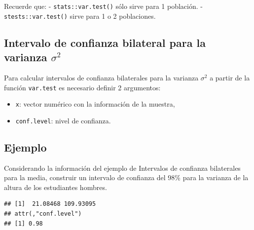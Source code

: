 \documentclass[
]{book}
\makeatletter
\newenvironment{Shaded}{\begin{snugshade}}{\end{snugshade}}
\newcommand{\AttributeTok}[1]{\textcolor[rgb]{0.77,0.63,0.00}{#1}}
\newcommand{\CommentTok}[1]{\textcolor[rgb]{0.56,0.35,0.01}{\textit{#1}}}
\newcommand{\FloatTok}[1]{\textcolor[rgb]{0.00,0.00,0.81}{#1}}
\newcommand{\FunctionTok}[1]{\textcolor[rgb]{0.00,0.00,0.00}{#1}}
\newcommand{\NormalTok}[1]{#1}
\newcommand{\OtherTok}[1]{\textcolor[rgb]{0.56,0.35,0.01}{#1}}
\newcommand{\SpecialCharTok}[1]{\textcolor[rgb]{0.00,0.00,0.00}{#1}}
\providecommand{\tightlist}{%
  \setlength{\itemsep}{0pt}\setlength{\parskip}{0pt}}
\newenvironment{kframe}{%
\medskip{}
\setlength{\fboxsep}{.8em}
 \def\at@end@of@kframe{}%
 \ifinner\ifhmode%
  \def\at@end@of@kframe{\end{minipage}}%
  \begin{minipage}{\columnwidth}%
 \fi\fi%
 \def\FrameCommand##1{\hskip\@totalleftmargin \hskip-\fboxsep
 \colorbox{shadecolor}{##1}\hskip-\fboxsep
     \hskip-\linewidth \hskip-\@totalleftmargin \hskip\columnwidth}%
 \MakeFramed {\advance\hsize-\width
   \@totalleftmargin\z@ \linewidth\hsize
   \@setminipage}}%
 {\par\unskip\endMakeFramed%
 \at@end@of@kframe}
\renewenvironment{Shaded}{\begin{kframe}}{\end{kframe}}
\newenvironment{rmdblock}[1]
  {
  \begin{itemize}
  \renewcommand{\labelitemi}{
    \raisebox{-.7\height}[0pt][0pt]{
      {\setkeys{Gin}{width=3em,keepaspectratio}\texttt{[image: images/\#1]}}
    }
  }
  \setlength{\fboxsep}{1em}
  \begin{kframe}
  \item
  }
  {
  \end{kframe}
  \end{itemize}
  }
\newenvironment{rmdnote}
  {\begin{rmdblock}{note}}
  {\end{rmdblock}}
\makeatother
\begin{document}
\begin{rmdnote}
Recuerde que:
- \texttt{stats::var.test()} sólo sirve para 1 población.
- \texttt{stests::var.test()} sirve para 1 o 2 poblaciones.
\end{rmdnote}

\hypertarget{intervalo-de-confianza-bilateral-para-la-varianza-sigma2}{%
\subsection{\texorpdfstring{Intervalo de confianza bilateral para la varianza \(\sigma^2\)}{Intervalo de confianza bilateral para la varianza \textbackslash sigma\^{}2}}\label{intervalo-de-confianza-bilateral-para-la-varianza-sigma2}}

Para calcular intervalos de confianza bilaterales para la varianza \(\sigma^2\) a partir de la función \texttt{var.test} es necesario definir 2 argumentos:

\begin{itemize}
\tightlist
\item
  \texttt{x}: vector numérico con la información de la muestra,
\item
  \texttt{conf.level}: nivel de confianza.
\end{itemize}

\hypertarget{ejemplo-59}{%
\subsection*{Ejemplo}\label{ejemplo-59}}

Considerando la información del ejemplo de Intervalos de confianza bilaterales para la media, construir un intervalo de confianza del 98\% para la varianza de la altura de los estudiantes hombres.

\begin{Shaded}
\end{Shaded}

\begin{verbatim}
## [1]  21.08468 109.93095
## attr(,"conf.level")
## [1] 0.98
\end{verbatim}
\end{document}
